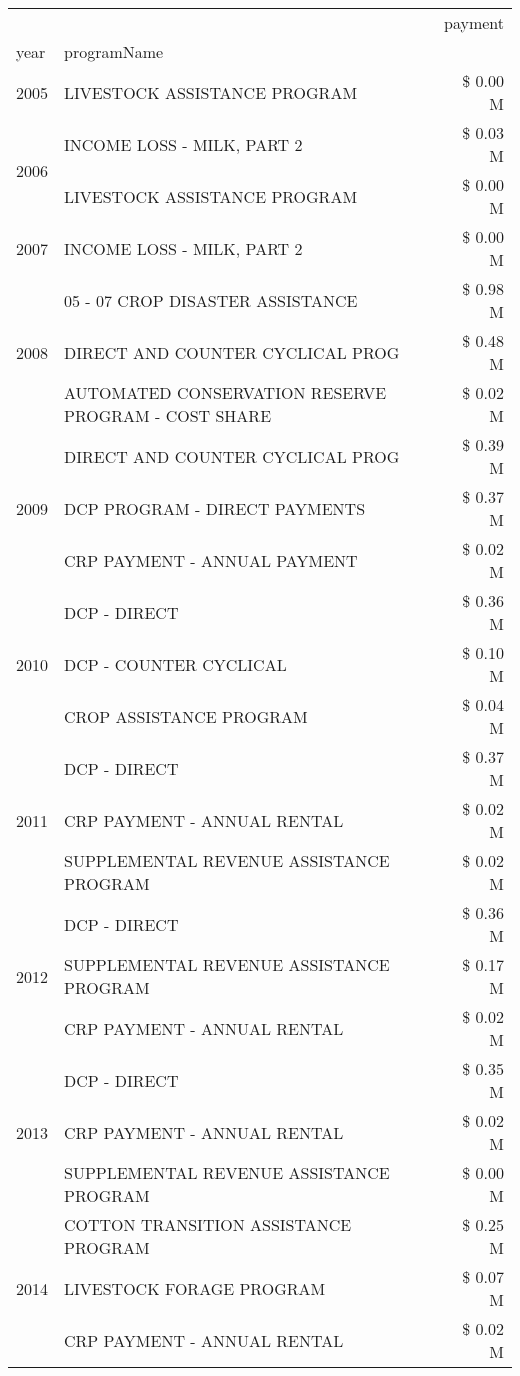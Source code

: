 \begin{tabular}{llr}
\toprule
 &  & payment \\
year & programName &  \\
\midrule
2005 & LIVESTOCK ASSISTANCE PROGRAM & \$ 0.00 M \\
\cline{1-3}
\multirow[t]{2}{*}{2006} & INCOME LOSS - MILK, PART 2 & \$ 0.03 M \\
 & LIVESTOCK ASSISTANCE PROGRAM & \$ 0.00 M \\
\cline{1-3}
2007 & INCOME LOSS - MILK, PART 2 & \$ 0.00 M \\
\cline{1-3}
\multirow[t]{3}{*}{2008} & 05 - 07 CROP DISASTER ASSISTANCE & \$ 0.98 M \\
 & DIRECT AND COUNTER CYCLICAL PROG & \$ 0.48 M \\
 & AUTOMATED CONSERVATION RESERVE PROGRAM - COST SHARE & \$ 0.02 M \\
\cline{1-3}
\multirow[t]{3}{*}{2009} & DIRECT AND COUNTER CYCLICAL PROG & \$ 0.39 M \\
 & DCP PROGRAM - DIRECT PAYMENTS & \$ 0.37 M \\
 & CRP PAYMENT - ANNUAL PAYMENT & \$ 0.02 M \\
\cline{1-3}
\multirow[t]{3}{*}{2010} & DCP - DIRECT & \$ 0.36 M \\
 & DCP - COUNTER CYCLICAL & \$ 0.10 M \\
 & CROP ASSISTANCE PROGRAM & \$ 0.04 M \\
\cline{1-3}
\multirow[t]{3}{*}{2011} & DCP - DIRECT & \$ 0.37 M \\
 & CRP PAYMENT - ANNUAL RENTAL & \$ 0.02 M \\
 & SUPPLEMENTAL REVENUE ASSISTANCE PROGRAM & \$ 0.02 M \\
\cline{1-3}
\multirow[t]{3}{*}{2012} & DCP - DIRECT & \$ 0.36 M \\
 & SUPPLEMENTAL REVENUE ASSISTANCE PROGRAM & \$ 0.17 M \\
 & CRP PAYMENT - ANNUAL RENTAL & \$ 0.02 M \\
\cline{1-3}
\multirow[t]{3}{*}{2013} & DCP - DIRECT & \$ 0.35 M \\
 & CRP PAYMENT - ANNUAL RENTAL & \$ 0.02 M \\
 & SUPPLEMENTAL REVENUE ASSISTANCE PROGRAM & \$ 0.00 M \\
\cline{1-3}
\multirow[t]{3}{*}{2014} & COTTON TRANSITION ASSISTANCE PROGRAM & \$ 0.25 M \\
 & LIVESTOCK FORAGE PROGRAM & \$ 0.07 M \\
 & CRP PAYMENT - ANNUAL RENTAL & \$ 0.02 M \\

\end{tabular}
